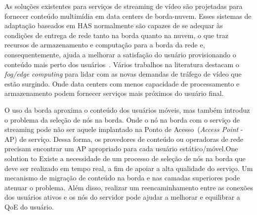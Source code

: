 
As soluções existentes para serviços de streaming de vídeo são projetadas para fornecer conteúdo multimídia em data centers de borda-nuvem. Esses sistemas de adaptação baseados em HAS normalmente são capazes de se adequar às condições de entrega de rede tanto na borda quanto na nuvem, o que traz recursos de armazenamento e computação para a borda da rede e, consequentemente, ajuda a melhorar a satisfação do usuário provisionando o conteúdo mais perto dos usuários~\cite{sitaraman:ACD2014}. 
Vários trabalhos na literatura destacam o \textit{fog/edge computing} para lidar com as novas demandas de tráfego de vídeo que estão surgindo. Onde data centers com menos capacidade de processamento e armazenamento podem fornecer serviços mais próximos do usuário final.



O uso da borda aproxima o conteúdo dos usuários móveis, mas também introduz o problema da seleção de nós na borda. Onde o nó na borda com o serviço de streaming pode não ser aquele implantado na Ponto de Acesso~(\textit{Access Point} - AP) de serviço. 
Dessa forma, os provedores de conteúdo ou operadoras de rede precisam encontrar um AP apropriado para cada usuário estático/móvel.One solution to 
% 
Existe a necessidade de um processo de seleção de nós na borda que deve ser realizado em tempo real, a fim de apoiar a alta qualidade do serviço. Um mecanismo de migração de conteúdo na borda e nas camadas superiores pode atenuar o problema. Além disso, realizar um reencaminhamento entre as conexões dos usuários ativos e os nós do servidor pode ajudar a melhorar e equilibrar a QoE do usuário.

